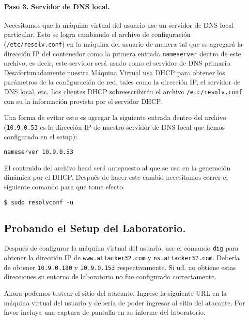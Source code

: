 \paragraph{Paso 3. Servidor de DNS local.}
Necesitamos que la máquina virtual del usuario use un servidor de DNS local particular.
Esto se logra cambiando el archivo de configuración (\texttt{/etc/resolv.conf}) en la máquina del usuario de manera tal que se agregará la dirección IP del contenedor como la primera entrada \texttt{nameserver} dentro de este archivo, es decir, este servidor será usado como el servidor de DNS primario.
Desafortunadamente nuestra Máquina Virtual usa DHCP para obtener los parámetros de la configuración de red, tales como la dirección IP, el servidor de DNS local, etc. Los clientes DHCP sobreescribirán el archivo \texttt{/etc/resolv.conf} con su la información provista por el servidor DHCP.

Una forma de evitar esto es agregar la siguiente entrada dentro del archivo   (\texttt{10.9.0.53} es la dirección IP de nuestro servidor de DNS local que hemos configurado en el setup):

\begin{lstlisting}
nameserver 10.9.0.53
\end{lstlisting}

El contenido del archivo head será antepuesto al que se usa en la generación dinámica por el DHCP. Después de hacer este cambio necesitamos correr el siguiente comando para que tome efecto.

\begin{lstlisting}
$ sudo resolvconf -u
\end{lstlisting}



\subsection{Probando el Setup del Laboratorio.}

Después de configurar la máquina virtual del usuario, use el comando \texttt{dig} para obtener la dirección IP de \texttt{www.attacker32.com} y \texttt{ns.attacker32.com}. Debería de obtener \texttt{10.9.0.180} y \texttt{10.9.0.153} respectivamente. Si ud. no obtiene estas direcciones su entorno de laboratorio no fue configurado correctamente.

Ahora podemos testear el sitio del atacante.
Ingrese la siguiente URL en la máquina virtual del usuario y debería de poder ingresar al sitio del atacante.
Por favor incluya una captura de pantalla en su informe del laboratorio.


